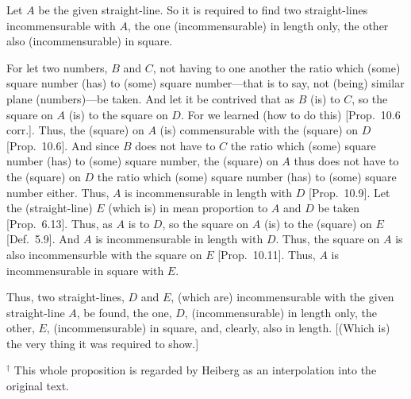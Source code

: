 \begin{Parallel}{}{}
{Let $A$ be the given straight-line. So it is required to find two straight-lines
incommensurable with $A$, the one (incommensurable) in length only,
the other also (incommensurable) in square.

For let two numbers, $B$ and $C$,  not having to one another
the ratio which (some) square number (has) to (some) square number---that
is to say, not (being) similar plane (numbers)---be taken. And let it be contrived
that as $B$ (is) to $C$, so the square on $A$ (is) to the square on $D$.
For we learned (how to do this) [Prop.~10.6 corr.].
Thus, the (square) on $A$ (is) commensurable with the (square) on $D$
[Prop.~10.6]. And since $B$ does not have to $C$ the
ratio which (some) square number (has) to (some) square number, the
(square) on $A$ thus does not have to the (square) on $D$ the ratio which (some) square number (has) to (some) square number either. Thus, $A$ is
incommensurable in length with $D$ [Prop.~10.9].
Let the (straight-line) $E$ (which is) in mean proportion to $A$ and $D$ 
be taken [Prop.~6.13]. Thus, as $A$ is to $D$, so the square on $A$ (is) to the (square)
on $E$ [Def.~5.9]. And $A$ is incommensurable in length with $D$. Thus, the square on $A$ is also incommensurble
with the square on $E$ [Prop.~10.11]. 
Thus, $A$ is incommensurable in square with $E$.

Thus, two straight-lines, $D$ and $E$, (which are) incommensurable with the given
straight-line $A$, be found, the one, $D$, (incommensurable)
in length only, the other, $E$, (incommensurable) in square, and, clearly, also in length. [(Which is) the very thing it was required to show.]}
\end{Parallel}
{\footnotesize\noindent$^\dag$ This whole proposition is regarded by Heiberg as an interpolation into the original text.}

